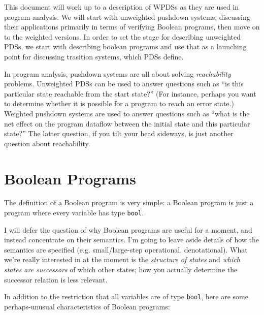 \documentclass{article}
\newcommand{\Code}[1]{\texttt{#1}}
\begin{document}
This document will work up to a description of WPDSs as they are used
in program analysis. We will start with unweighted pushdown systems,
discussing their applications primarily in terms of verifying Boolean
programs, then move on to the weighted versions. In order to set the
stage for describing unweighted PDSs, we start with describing boolean
programs and use that as a launching point for discussing trasition
systems, which PDSs define.

In program analysis, pushdown systems are all about solving
\emph{reachability} problems. Unweighted PDSs can be used to answer
questions such as ``is this particular state reachable from the start
state?'' (For instance, perhaps you want to determine whether it is
possible for a program to reach an error state.) Weighted pushdown
systems are used to answer questions such as ``what is the net effect
on the program dataflow between the initial state and this particular
state?'' The latter question, if you tilt your head sideways, is just
another question about reachability.


\section{Boolean Programs}
The definition of a Boolean program is very simple: a Boolean program
is just a program where every variable has type \Code{bool}.

I will defer the question of why Boolean programs are useful for a
moment, and instead concentrate on their semantics. I'm going to leave
aside details of how the semantics are specified (e.g. small/large-step
operational, denotational). What we're really interested
in at the moment is the \emph{structure of states} and \emph{which
  states are successors} of which other states; how you actually
determine the successor relation is less relevant.

In addition to the restriction that all variables are of type \Code{bool},
here are some perhaps-unusual characteristics of Boolean programs:
\end{document}
